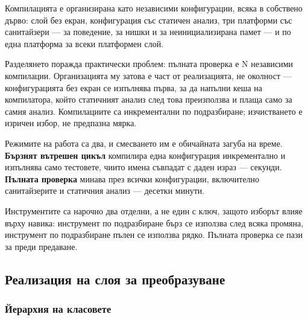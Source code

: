 Компилацията е организирана като независими конфигурации, всяка в собствено дърво: слой
без екран, конфигурация със статичен анализ, три платформи със санитайзери --- за
поведение, за нишки и за неинициализирана памет --- и по една платформа за всеки
платформен слой.

Разделянето поражда практически проблем: пълната проверка е N независими компилации.
Организацията му затова е част от реализацията, не околност --- конфигурацията без екран
се изпълнява първа, за да напълни кеша на компилатора, който статичният анализ след това
преизползва и плаща само за самия анализ. Компилациите са инкрементални по подразбиране;
изчистването е изричен избор, не предпазна мярка.

Режимите на работа са два, и смесването им е обичайната загуба на време. \textbf{Бързият
вътрешен цикъл} компилира една конфигурация инкрементално и изпълнява само тестовете,
чиито имена съвпадат с даден израз --- секунди. \textbf{Пълната проверка} минава през
всички конфигурации, включително санитайзерите и статичния анализ --- десетки минути.

Инструментите са нарочно два отделни, а не един с ключ, защото изборът влияе върху навика:
инструмент по подразбиране бърз се използва след всяка промяна, инструмент по подразбиране
пълен се използва рядко. Пълната проверка се пази за преди предаване.

\subsection{Реализация на слоя за преобразуване}
\label{subsec:handler_impl}

\subsubsection{Йерархия на класовете}

